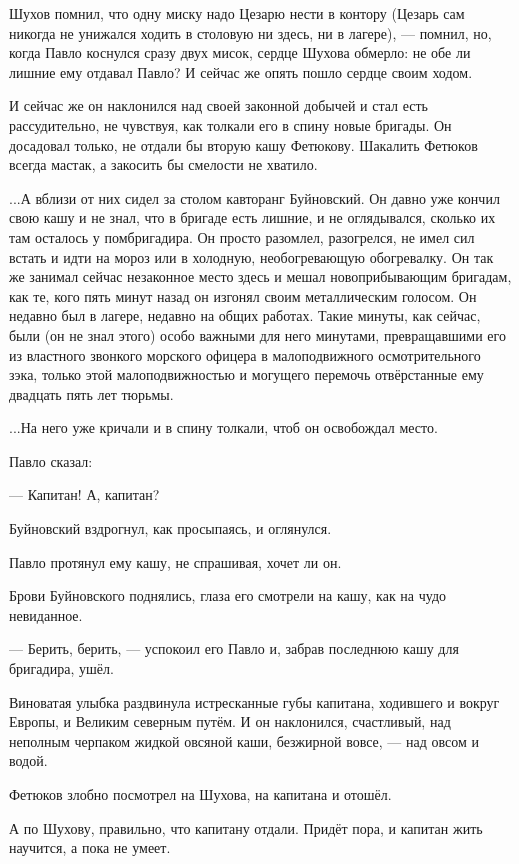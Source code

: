 Шухов помнил, что одну миску надо Цезарю нести в контору (Цезарь сам никогда не унижался
ходить в столовую ни здесь, ни в лагере), --- помнил, но, когда Павло коснулся сразу двух мисок,
сердце Шухова обмерло: не обе ли лишние ему отдавал Павло? И сейчас же опять пошло сердце
своим ходом.

И сейчас же он наклонился над своей законной добычей и стал есть рассудительно, не чувствуя,
как толкали его в спину новые бригады. Он досадовал только, не отдали бы вторую кашу
Фетюкову. Шакалить Фетюков всегда мастак, а закосить бы смелости не хватило.

...А вблизи от них сидел за столом кавторанг Буйновский. Он давно уже кончил свою кашу и не
знал, что в бригаде есть лишние, и не оглядывался, сколько их там осталось у помбригадира. Он
просто разомлел, разогрелся, не имел сил встать и идти на мороз или в холодную,
необогревающую обогревалку. Он так же занимал сейчас незаконное место здесь и мешал
новоприбывающим бригадам, как те, кого пять минут назад он изгонял своим металлическим
голосом. Он недавно был в лагере, недавно на общих работах. Такие минуты, как сейчас, были (он
не знал этого) особо важными для него минутами, превращавшими его из властного звонкого
морского офицера в малоподвижного осмотрительного зэка, только этой малоподвижностью и
могущего перемочь отвёрстанные ему двадцать пять лет тюрьмы.

...На него уже кричали и в спину толкали, чтоб он освобождал место.

Павло сказал:

--- Капитан! А, капитан?

Буйновский вздрогнул, как просыпаясь, и оглянулся.

Павло протянул ему кашу, не спрашивая, хочет ли он.

Брови Буйновского поднялись, глаза его смотрели на кашу, как на чудо невиданное.

--- Берить, берить, --- успокоил его Павло и, забрав последнюю кашу для бригадира, ушёл.

Виноватая улыбка раздвинула истресканные губы капитана, ходившего и вокруг Европы, и
Великим северным путём. И он наклонился, счастливый, над неполным черпаком жидкой овсяной
каши, безжирной вовсе, --- над овсом и водой.

Фетюков злобно посмотрел на Шухова, на капитана и отошёл.

А по Шухову, правильно, что капитану отдали. Придёт пора, и капитан жить научится, а пока не
умеет.

